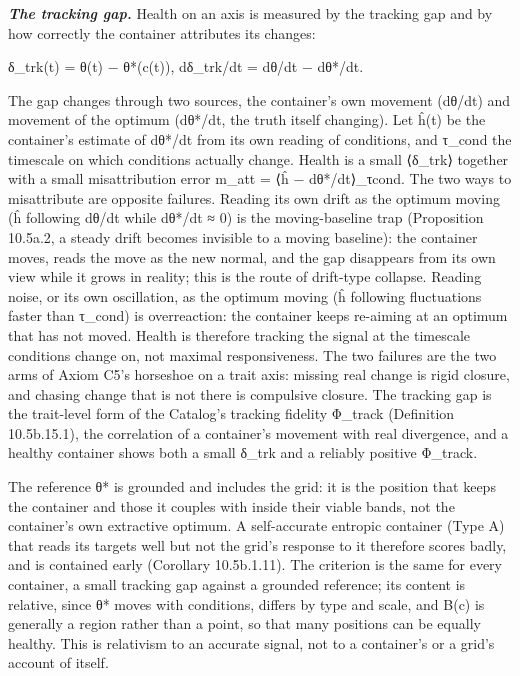 \documentclass[
]{article}
\begin{document}
\emph{\textbf{The tracking gap.}} Health on an axis is measured by the
tracking gap and by how correctly the container attributes its changes:

δ\_trk(t) = θ(t) − θ*(c(t)), dδ\_trk/dt = dθ/dt − dθ*/dt.

The gap changes through two sources, the container's own movement
(dθ/dt) and movement of the optimum (dθ*/dt, the truth itself changing).
Let ĥ(t) be the container's estimate of dθ*/dt from its own reading of
conditions, and τ\_cond the timescale on which conditions actually
change. Health is a small ⟨\textbar δ\_trk\textbar⟩ together with a
small misattribution error m\_att = ⟨\textbar ĥ −
dθ*/dt\textbar⟩\_τcond. The two ways to misattribute are opposite
failures. Reading its own drift as the optimum moving (ĥ following dθ/dt
while dθ*/dt ≈ 0) is the moving-baseline trap (Proposition 10.5a.2, a
steady drift becomes invisible to a moving baseline): the container
moves, reads the move as the new normal, and the gap disappears from its
own view while it grows in reality; this is the route of drift-type
collapse. Reading noise, or its own oscillation, as the optimum moving
(ĥ following fluctuations faster than τ\_cond) is overreaction: the
container keeps re-aiming at an optimum that has not moved. Health is
therefore tracking the signal at the timescale conditions change on, not
maximal responsiveness. The two failures are the two arms of Axiom C5's
horseshoe on a trait axis: missing real change is rigid closure, and
chasing change that is not there is compulsive closure. The tracking gap
is the trait-level form of the Catalog's tracking fidelity Φ\_track
(Definition 10.5b.15.1), the correlation of a container's movement with
real divergence, and a healthy container shows both a small δ\_trk and a
reliably positive Φ\_track.

The reference θ* is grounded and includes the grid: it is the position
that keeps the container and those it couples with inside their viable
bands, not the container's own extractive optimum. A self-accurate
entropic container (Type A) that reads its targets well but not the
grid's response to it therefore scores badly, and is contained early
(Corollary 10.5b.1.11). The criterion is the same for every container, a
small tracking gap against a grounded reference; its content is
relative, since θ* moves with conditions, differs by type and scale, and
B(c) is generally a region rather than a point, so that many positions
can be equally healthy. This is relativism to an accurate signal, not to
a container's or a grid's account of itself.
\end{document}
